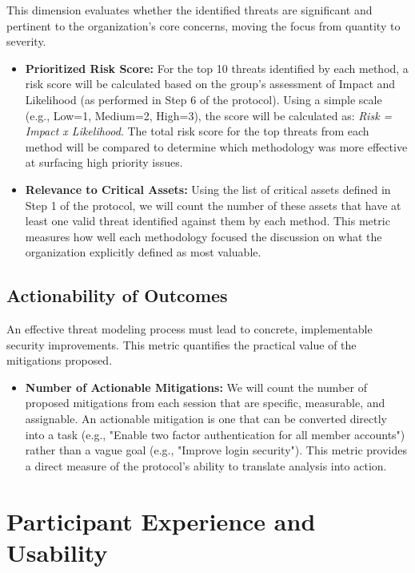 This dimension evaluates whether the identified threats are significant and
pertinent to the organization's core concerns, moving the focus from quantity to
severity.

\begin{itemize}
\item \textbf{Prioritized Risk Score:} For the top 10 threats identified by each
method, a risk score will be calculated based on the group's assessment of
Impact and Likelihood (as performed in Step 6 of the protocol). Using a simple
scale (e.g., Low=1, Medium=2, High=3), the score will be calculated as:
\textit{Risk = Impact x Likelihood}. The total risk score for the top threats
from each method will be compared to determine which methodology was more
effective at surfacing high priority issues.
\item \textbf{Relevance to Critical Assets:} Using the list of critical assets
defined in Step 1 of the protocol, we will count the number of these assets that
have at least one valid threat identified against them by each method. This
metric measures how well each methodology focused the discussion on what the
organization explicitly defined as most valuable.
\end{itemize}

\subsection{Actionability of Outcomes}
\label{subsec:actionability_of_outcomes}
An effective threat modeling process must lead to concrete, implementable
security improvements. This metric quantifies the practical value of the
mitigations proposed.
\begin{itemize}
\item \textbf{Number of Actionable Mitigations:} We will count the number of
proposed mitigations from each session that are specific, measurable, and
assignable. An actionable mitigation is one that can be converted directly into
a task (e.g., "Enable two factor authentication for all member accounts") rather
than a vague goal (e.g., "Improve login security"). This metric provides a
direct measure of the protocol's ability to translate analysis into action.
\end{itemize}

\section{Participant Experience and Usability}
\label{sec:participant_experience}


